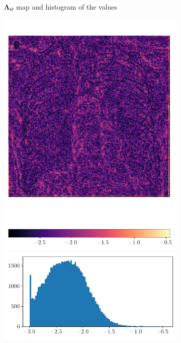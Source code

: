 \documentclass[12pt]{article}
\begin{document}
\begin{figure}[H]
\begin{subfigure}{0.48\textwidth}
  \caption{$\mathbf{\Lambda}_{\Theta}$ map and histogram of the values}
  \end{subfigure}
  \begin{subfigure}{0.48\textwidth}
  \includegraphics[width=1\linewidth]{images//chest_xray/ex_2/lambda_map_log.png}
  \includegraphics[width=1\linewidth]{images//chest_xray/ex_2/lambda_map_values_histogram_log.png}

\end{subfigure}
\end{figure}
\end{document}

